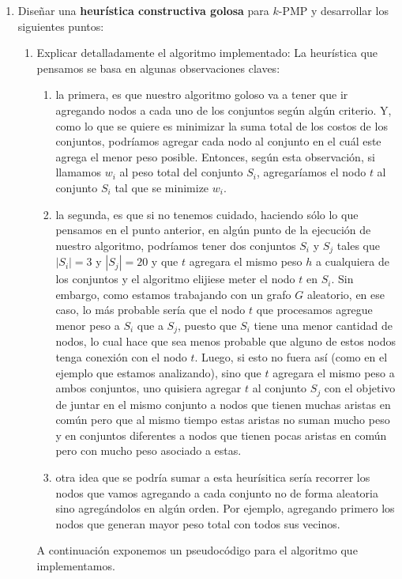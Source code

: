 \documentclass[11pt, a4paper, twoside]{article}
\begin{document}
\begin{enumerate}
    \item Diseñar una \textbf{heurística constructiva golosa} para $k$-PMP y desarrollar los siguientes
    puntos:
    \begin{enumerate}
		\item Explicar detalladamente el algoritmo implementado:
		La heurística que pensamos se basa en algunas observaciones claves: 
		\begin{enumerate}
			\item la primera, es que nuestro
			algoritmo goloso va a tener que ir agregando nodos a cada uno de los conjuntos según algún criterio. Y,
			como lo que se quiere es minimizar la suma total de los costos de los conjuntos, podríamos agregar
			cada nodo al conjunto en el cuál este agrega el menor peso posible. Entonces, según esta observación,
			si llamamos $w_{i}$ al peso total del conjunto $S_{i}$, 
			agregaríamos el nodo $t$ al conjunto $S_{i}$ tal que se minimize $w_{i}$.
			\item la segunda, es que si no tenemos cuidado, haciendo sólo lo que pensamos en el punto anterior,
			en algún punto de la ejecución de nuestro algoritmo, podríamos tener dos conjuntos $S_{i}$ y $S_{j}$ tales
			que $|S_{i}| = 3$ y $|S_{j}| = 20$ y que $t$ agregara el mismo peso $h$ a cualquiera de los conjuntos y el
			algoritmo elijiese meter el nodo $t$ en $S_{i}$.
			Sin embargo, como estamos trabajando con un grafo $G$ aleatorio, 
			en ese caso, lo más probable sería que el nodo $t$ que procesamos 
			agregue menor peso a $S_{i}$ que a $S_{j}$, puesto que $S_{i}$ tiene una menor cantidad de 
			nodos, lo cual hace que sea menos probable que alguno de estos nodos tenga conexión con el nodo $t$. Luego,
			si esto no fuera así (como en el ejemplo que estamos analizando), sino que $t$ agregara el mismo peso a
			ambos conjuntos, uno quisiera agregar $t$ al conjunto $S_{j}$ con el objetivo de juntar en el mismo 
			conjunto a nodos que tienen muchas aristas en común pero que al mismo tiempo estas aristas no suman
			mucho peso y en conjuntos diferentes a nodos que tienen pocas aristas en común pero con mucho peso
			asociado a estas.
			\item otra idea que se podría sumar a esta heurísitica sería recorrer los nodos que vamos agregando a
			cada conjunto no de forma aleatoria sino agregándolos en algún orden. Por ejemplo, agregando primero
			los nodos que generan mayor peso total con todos sus vecinos.
		\end{enumerate}
		A continuación exponemos un pseudocódigo para el algoritmo que implementamos. \\

\end{enumerate}
\end{enumerate}
\end{document}

